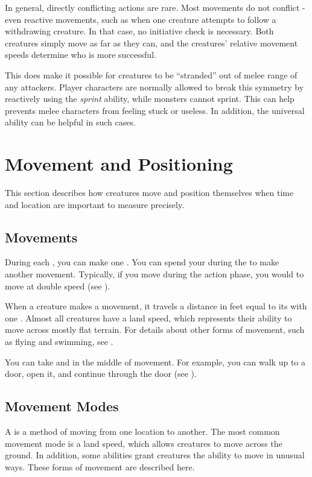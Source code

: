         In general, directly conflicting actions are rare.
        Most movements do not conflict - even reactive movements, such as when one creature attempts to follow a withdrawing creature.
        In that case, no initiative check is necessary.
        Both creatures simply move as far as they can, and the creatures' relative movement speeds determine who is more successful.

        This does make it possible for creatures to be ``stranded'' out of melee range of any attackers.
        Player characters are normally allowed to break this symmetry by reactively using the \textit{sprint} ability, while monsters cannot sprint.
        This can help prevents melee characters from feeling stuck or useless.
        In addition, the  universal ability can be helpful in such cases.

\section{Movement and Positioning}\label{Movement and Positioning}
    This section describes how creatures move and position themselves when time and location are important to measure precisely.

    \subsection{Movements}\label{Movements}
        During each , you can make one .
        You can spend your  during the  to make another movement.
        Typically, if you move during the action phase, you would  to move at double speed (see ).

        When a creature makes a movement, it travels a distance in feet equal to its  with one .
        Almost all creatures have a land speed, which represents their ability to move across mostly flat terrain.
        For details about other forms of movement, such as flying and swimming, see .

        You can take  and  in the middle of movement.
        For example, you can walk up to a door, open it, and continue through the door (see ).

    \subsection{Movement Modes}\label{Movement Modes}
        A  is a method of moving from one location to another.
        The most common movement mode is a land speed, which allows creatures to move across the ground.
        In addition, some abilities grant creatures the ability to move in unusual ways.
        These forms of movement are described here.

